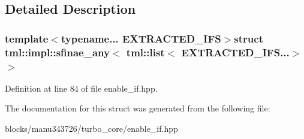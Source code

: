 \subsection{Detailed Description}
\subsubsection*{template$<$typename... E\+X\+T\+R\+A\+C\+T\+E\+D\+\_\+\+I\+F\+S$>$struct tml\+::impl\+::sfinae\+\_\+any$<$ tml\+::list$<$ E\+X\+T\+R\+A\+C\+T\+E\+D\+\_\+\+I\+F\+S...$>$ $>$}



Definition at line 84 of file enable\+\_\+if.\+hpp.



The documentation for this struct was generated from the following file\+:\begin{DoxyCompactItemize}
\item 
blocks/manu343726/turbo\+\_\+core/enable\+\_\+if.\+hpp\end{DoxyCompactItemize}
